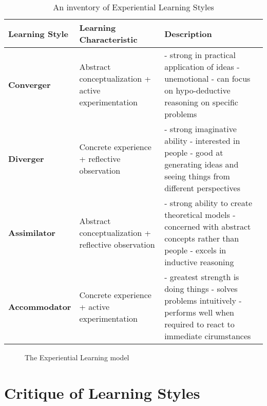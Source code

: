 \documentclass[12pt]{article}
\begin{document}
\begin{singlespacing}
    \begin{table}[H]
        \begin{tabular}{|l|p{5cm}|p{6cm}|}
            \hline
            \textbf{Learning Style} & \textbf{Learning Characteristic} & \textbf{Description} \\ \hline
            \textbf{Converger} & Abstract conceptualization + active experimentation &
            - strong in practical application of ideas \newline
            - unemotional \newline
            - can focus on hypo-deductive reasoning on specific problems \\ \hline
            \textbf{Diverger} & Concrete experience + reflective observation &
            - strong imaginative ability \newline
            - interested in people \newline
            - good at generating ideas and seeing things from different perspectives \\ \hline
            \textbf{Assimilator} & Abstract conceptualization + reflective observation &
            - strong ability to create theoretical models \newline
            - concerned with abstract concepts rather than people \newline
            - excels in inductive reasoning \\ \hline
            \textbf{Accommodator} & Concrete experience + active experimentation &
            - greatest strength is doing things \newline
            - solves problems intuitively \newline
            - performs well when required to react to immediate cirumstances \\ \hline
        \end{tabular}
        \caption{An inventory of Experiential Learning Styles}
    \end{table}
\end{singlespacing}

\begin{figure}[H]
    \centering
    \caption{The Experiential Learning model}
\end{figure}

\section{Critique of Learning Styles}
\end{document}
